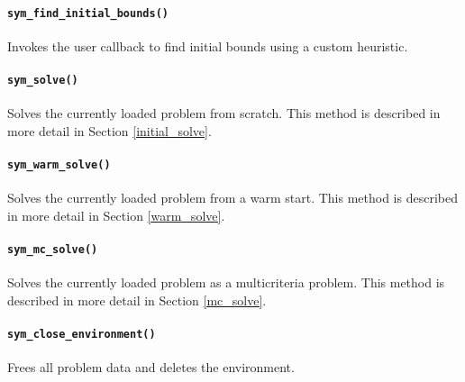 \paragraph{\texttt{sym\_find\_initial\_bounds()}} Invokes the user callback to
find initial bounds using a custom heuristic.

\paragraph{\texttt{sym\_solve()}} Solves the currently loaded problem from
scratch. This method is described in more detail in Section 
\ref{initial_solve}.

\paragraph{\texttt{sym\_warm\_solve()}} Solves the currently loaded problem 
from a warm start. This method is described in more detail in 
Section \ref{warm_solve}.\\

\paragraph{\texttt{sym\_mc\_solve()}} Solves the currently loaded problem as a
multicriteria problem. This method is described in more detail in Section 
\ref{mc_solve}.

\paragraph{\texttt{sym\_close\_environment()}} Frees all problem data and
deletes the environment. \\

